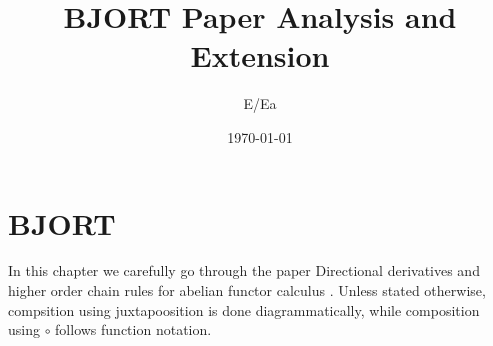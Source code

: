 \documentclass[12pt]{book}
\begin{document}


\title{BJORT Paper Analysis and Extension}
\author{E/Ea}
\date{\today}



\maketitle

\tableofcontents



% 



% 


% 



% 


\chapter{BJORT}

\newcommand{\crn}{\text{cr}}
\newcommand{\invbn}{\text{!`}}

In this chapter we carefully go through the paper Directional derivatives and higher order chain rules for abelian
functor calculus \cite{BJORT}. Unless stated otherwise, compsition using juxtapoosition is done diagrammatically, while composition using $\circ$ follows function notation.
\end{document}
